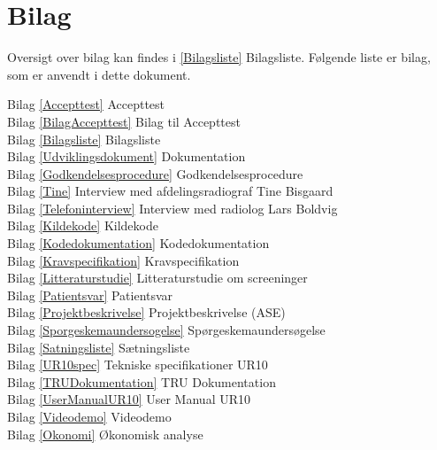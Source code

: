 \chapter{Bilag}\label{kapitel_Bilag}
Oversigt over bilag kan findes i \ref{Bilagsliste} Bilagsliste. Følgende liste er bilag, som er anvendt i dette dokument. 

Bilag \ref{Accepttest} Accepttest \\
Bilag \ref{BilagAccepttest} Bilag til Accepttest \\
Bilag \ref{Bilagsliste} Bilagsliste \\ 
Bilag \ref{Udviklingsdokument} Dokumentation\\
Bilag \ref{Godkendelsesprocedure} Godkendelsesprocedure \\
Bilag \ref{Tine} Interview med afdelingsradiograf Tine Bisgaard \\
Bilag \ref{Telefoninterview} Interview med radiolog Lars Boldvig \\
Bilag \ref{Kildekode} Kildekode \\
Bilag \ref{Kodedokumentation} Kodedokumentation \\
Bilag \ref{Kravspecifikation} Kravspecifikation \\
Bilag \ref{Litteraturstudie} Litteraturstudie om screeninger \\
Bilag \ref{Patientsvar} Patientsvar \\
Bilag \ref{Projektbeskrivelse} Projektbeskrivelse (ASE) \\
Bilag \ref{Sporgeskemaundersogelse} Spørgeskemaundersøgelse\\
Bilag \ref{Satningsliste} Sætningsliste \\
Bilag \ref{UR10spec} Tekniske specifikationer UR10 \\
Bilag \ref{TRUDokumentation} TRU Dokumentation \\
Bilag \ref{UserManualUR10} User Manual UR10 \\
Bilag \ref{Videodemo} Videodemo \\
Bilag \ref{Okonomi} Økonomisk analyse \\


